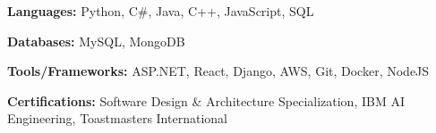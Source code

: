 \begin{siderulesSos}
\begin{skillSection}
\cvskillentry
    {
      \begin{cvsositems}
        \item {\color{black}\textbf{Languages:} Python, C\#, Java, C++, JavaScript, SQL}
        \item {\color{black}\textbf{Databases:} MySQL, MongoDB}
        \item {\color{black}\textbf{Tools/Frameworks:} ASP.NET, React, Django, AWS, Git, Docker, NodeJS}
        \item {\color{black}\textbf{Certifications:} Software Design \& Architecture Specialization, IBM AI Engineering, Toastmasters International}
      \end{cvsositems}
    }
\end{skillSection}
\end{siderulesSos}
